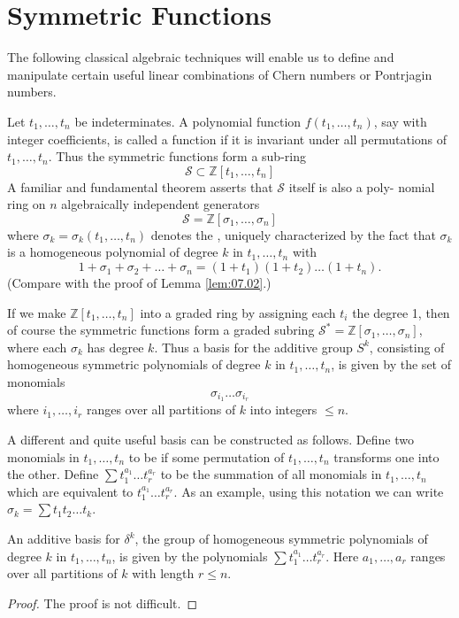\documentclass[../main]{subfiles}
\begin{document}
\section{Symmetric Functions}
The following classical algebraic techniques will enable us to define and manipulate certain useful linear combinations of Chern numbers or Pontrjagin numbers.

Let $t_{1}, \ldots, t_{n}$ be indeterminates. A polynomial function $f(t_{1}, \ldots, t_{n})$, say with integer coefficients, is called a  function if it is invariant under all permutations of $t_{1}, \ldots, t_{n}$. Thus the symmetric functions form a sub-ring
\[
\mathcal{S} \subset \mathbb{Z}[t_{1}, \ldots, t_{n}]
\]
A familiar and fundamental theorem asserts that $\mathcal{S}$ itself is also a poly- nomial ring on $n$ algebraically independent generators
\[
\mathcal{S}=\mathbb{Z}[\sigma_{1}, \ldots, \sigma_{n}]
\]
where $\sigma_{k}=\sigma_{k}(t_{1}, \ldots, t_{n})$ denotes the , uniquely characterized by the fact that $\sigma_{k}$ is a homogeneous polynomial of degree $k$ in $t_{1}, \ldots, t_{n}$ with
\[
1+\sigma_{1}+\sigma_{2}+\ldots+\sigma_{n}=(1+t_{1})(1+t_{2}) \ldots(1+t_{n}).
\]
(Compare with the proof of Lemma \ref{lem:07.02}.)

If we make $\mathbb{Z}[t_{1}, \ldots, t_{n}]$ into a graded ring by assigning each $t_{i}$ the degree 1, then of course the symmetric functions form a graded subring $\mathcal{S}^{*}=\mathbb{Z}[\sigma_{1}, \ldots, \sigma_{n}]$, where each $\sigma_{k}$ has degree $k$. Thus a basis for the additive group $S^{k}$, consisting of homogeneous symmetric polynomials of degree $k$ in $t_{1}, \ldots, t_{n}$, is given by the set of monomials
\[
\sigma_{i_{1}} \ldots \sigma_{i_{r}}
\]
where $i_{1}, \ldots, i_{r}$ ranges over all partitions of $k$ into integers $\leq n$.

A different and quite useful basis can be constructed as follows. Define two monomials in $t_{1}, \ldots, t_{n}$ to be  if some permutation of $t_{1}, \ldots, t_{n}$ transforms one into the other. Define $\sum t_{1}^{a_{1}} \ldots t_{r}^{a_{r}}$ to be the summation of all monomials in $t_{1}, \ldots, t_{n}$ which are equivalent to $t_{1}^{a_{1}} \ldots t_{r}^{a_{r}}$. As an example, using this notation we can write $\sigma_{k}=\sum t_{1} t_{2} \ldots t_{k}$.

\begin{lemma}\label{lem:16.1}
An additive basis for $\delta^{k}$, the group of homogeneous symmetric polynomials of degree $k$ in $t_{1}, \ldots, t_{n}$, is given by the polynomials $\sum t_1^{a_1}\dots t_r^{a_r}$. Here $a_{1}, \ldots, a_{r}$ ranges over all partitions of $k$ with length $r \leq n$.

\end{lemma} 
\begin{proof}
The proof is not difficult.
\end{proof}
\end{document}

